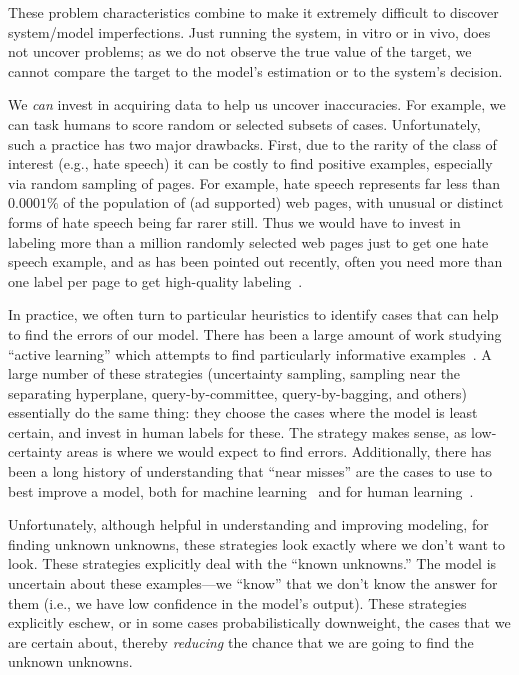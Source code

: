 These problem characteristics combine to make it extremely difficult to
discover system/model imperfections.  Just running the system, in
vitro or in vivo, does not uncover problems; as we do not observe
the true value of the target, we cannot compare the target to the model's
estimation or to the system's decision.

We \textit{can} invest in acquiring data to help us uncover inaccuracies.  For example, we can task humans to score random or selected subsets of cases.  Unfortunately, such a practice has two major drawbacks.  First, due to the rarity of the class of interest (e.g., hate speech) it can be costly to find positive examples, especially via random sampling of pages.  For example, hate speech represents far less than $0.0001\%$ of the population of (ad supported) web pages, with unusual or distinct forms of hate speech being far rarer still. Thus we would have to invest in labeling more than a million randomly selected web pages just to get one hate speech example, and as has been pointed out recently, often you need more than one label per page to get high-quality labeling~\cite{shengKDD2008,raykar2009supervised}.




In practice, we often turn to particular heuristics to identify
cases that can help to find the errors of our model.  There has been a
large amount of work studying ``active learning'' which attempts to
find particularly informative examples~\cite{SettlesActiveLearning}.
A large number of these strategies (uncertainty sampling, sampling
near the separating hyperplane, query-by-committee, query-by-bagging,
and others) essentially do the same thing: they choose the cases where
the model is least certain, and invest in human labels for these.
The strategy makes sense, as low-certainty areas is where we would expect to find
errors.  Additionally, there has been a long history of understanding that
``near misses'' are the cases to use to best improve a model, both for
machine learning~\cite{winston1970learning} and for human
learning~\cite{vanlehn1998analogy}.

Unfortunately, although helpful in understanding and improving
modeling, for finding unknown unknowns, 
these strategies look exactly where we don't want to look.
These strategies explicitly deal with the ``known unknowns.''  The
model is uncertain about these examples---we ``know'' that we don't
know the answer for them (i.e., we have low confidence in the model's
output).  These strategies explicitly eschew, or in some cases
probabilistically downweight, the cases that we are
certain about, thereby \textit{reducing} the chance that we are going
to find the unknown unknowns.

